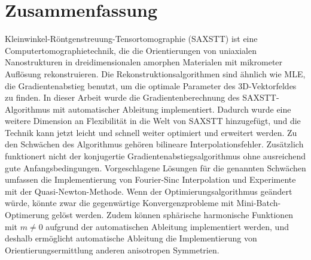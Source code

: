 \pagebreak
\chapter*{Zusammenfassung}
Kleinwinkel-Röntgenstreuung-Tensortomographie (SAXSTT) ist eine Computertomographietechnik,
die die Orientierungen von uniaxialen Nanostrukturen in dreidimensionalen amorphen Materialen mit mikrometer Auflösung rekonstruieren.
Die Rekonstruktionsalgorithmen sind ähnlich wie MLE, die Gradientenabstieg benutzt, um die optimale Parameter des 3D-Vektorfeldes zu finden.
In dieser Arbeit wurde die Gradientenberechnung des SAXSTT-Algorithmus mit automatischer Ableitung implementiert.
Dadurch wurde eine weitere Dimension an Flexibilität in die Welt von SAXSTT hinzugefügt, und die Technik kann jetzt leicht und schnell weiter optimiert und erweitert werden.
Zu den Schwächen des Algorithmus gehören bilineare Interpolationsfehler.
Zusätzlich funktionert nicht der konjugertie Gradientenabstiegsalgorithmus ohne ausreichend gute Anfangsbedingungen.
Vorgeschlagene Lösungen für die genannten Schwächen umfassen die Implementierung von Fourier-Sinc Interpolation und Experimente mit der Quasi-Newton-Methode.
Wenn der Optimierungsalgorithmus geändert würde, könnte zwar die gegenwärtige Konvergenzprobleme mit Mini-Batch-Optimerung gelöst werden.
\noindent
Zudem können sphärische harmonische Funktionen mit $m \neq 0$ aufgrund der automatischen Ableitung implementiert werden,
und deshalb ermöglicht automatische Ableitung die Implementierung von Orientierungsermittlung anderen anisotropen Symmetrien.


\endgroup

\vfill
